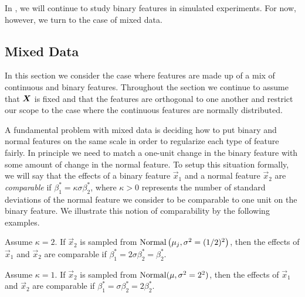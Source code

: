 In , we will continue to study binary features in simulated
experiments. For now, however, we turn to the case of mixed data.

\subsection{Mixed Data}\label{sec:mixed-data}

In this section we consider the case where features are made up of a mix of continuous and
binary features. Throughout the section we continue to assume that \(\boldsymbol{X}\) is fixed and
that the features are orthogonal to one another and restrict our scope to the case where
the continuous features are normally distributed.

A fundamental problem with mixed data is deciding how to put binary and normal features on
the same scale in order to regularize each type of feature fairly. In principle we need to
match a one-unit change in the binary feature with some amount of change in the normal
feature. To setup this situation formally, we will say that the effects of a binary feature
\(\vec{x}_1\) and a normal feature \(\vec{x}_2\) are \emph{comparable} if \(\beta^*_1 =
\kappa \sigma \beta^*_2\), where \(\kappa > 0\) represents the number of standard
deviations of the normal feature we consider to be comparable to one unit on the binary
feature. We illustrate this notion of comparability by the following examples.

\begin{example}
  Assume \(\kappa = 2\). If \(\vec{x}_2\) is sampled from
  \(\operatorname{Normal}\left(\mu_j, \sigma^2 = (1/2)^2\right)\), then the effects of \(\vec{x}_1\) and
  \(\vec{x}_2\) are comparable if \(\beta_1^* = 2\sigma \beta_2^* = \beta_2^*\).
\end{example}
\begin{example}
  Assume \(\kappa = 1\). If \(\vec{x}_2\) is sampled from \(\operatorname{Normal}(\mu,
  \sigma^2 = 2^2)\), then the effects of \(\vec{x}_1\) and \(\vec{x}_2\) are comparable if
  \(\beta_1^* = \sigma\beta_2^* = 2\beta_2^*\).
\end{example}

